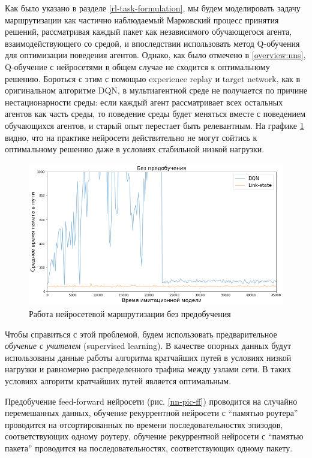 \documentclass[specification, annotation]{itmo-student-thesis}
\begin{document}
Как было указано в разделе \ref{rl-task-formulation}, мы будем моделировать
задачу маршрутизации как частично наблюдаемый Марковский процесс принятия
решений, рассматривая каждый пакет как независимого обучающегося агента,
взаимодействующего со средой, и впоследствии использовать метод Q-обучения для
оптимизации поведения агентов. Однако, как было отмечено в \ref{overview:nns},
Q-обучение с нейросетями в общем случае не сходится к оптимальному решению.
Бороться с этим с помощью experience replay и target network, как в оригинальном
алгоритме DQN, в мультиагентной среде не получается по причине
нестационарности среды: если каждый агент рассматривает всех остальных агентов
как часть среды, то поведение среды будет меняться вместе с поведением
обучающихся агентов, и старый опыт перестает быть релевантным. На графике
\ref{non-convergence} видно, что на практике нейросети действительно не могут
сойтись к оптимальному решению даже в условиях стабильной низкой нагрузки.

\begin{figure}[!h]
  \caption{Работа нейросетевой маршрутизации без
    предобучения}\label{non-convergence}
  \centering
  \includegraphics[scale=0.6]{non-convergence}
\end{figure}

Чтобы справиться с этой проблемой, будем использовать предварительное
\textit{обучение с учителем} (supervised learning). В качестве опорных данных
будут использованы данные работы алгоритма кратчайших путей в условиях низкой
нагрузки и равномерно распределенного трафика между узлами сети. В таких
условиях алгоритм кратчайших путей является оптимальным.

Предобучение feed-forward нейросети (рис. \ref{nn-pic-ff}) проводится на случайно
перемешанных данных, обучение рекуррентной нейросети с \enquote{памятью роутера}
проводится на отсортированных по времени последовательностях эпизодов,
соответствующих одному роутеру, обучение рекуррентной нейросети с \enquote{памятью
пакета} проводится на последовательностях, соответствующих одному пакету.
\end{document}

